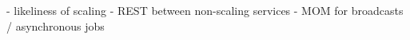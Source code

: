   - likeliness of scaling
  - REST between non-scaling services
  - MOM for broadcasts / asynchronous jobs






